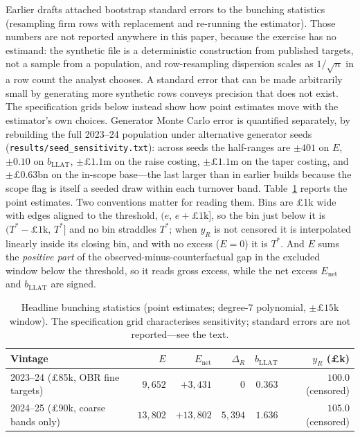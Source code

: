 Earlier drafts attached bootstrap standard errors to the bunching statistics
(resampling firm rows with replacement and re-running the estimator). Those
numbers are not reported anywhere in this paper, because the exercise has no
estimand: the synthetic file is a deterministic construction from published
targets, not a sample from a population, and row-resampling dispersion scales
as $1/\sqrt{n}$ in a row count the analyst chooses. A standard error that can
be made arbitrarily small by generating more synthetic rows conveys precision
that does not exist. The specification grids below instead show how point
estimates move with the estimator's own choices. Generator Monte Carlo error is
quantified separately, by rebuilding the full 2023--24 population under
alternative generator seeds (\texttt{results/seed\_sensitivity.txt}): across
seeds the half-ranges are $\pm401$ on $E$, $\pm0.10$ on
$b_{\mathrm{LLAT}}$, $\pm\pounds1.1$m on the raise costing,
$\pm\pounds1.1$m on the taper costing, and $\pm\pounds0.63$bn
on the in-scope base---the last larger than in earlier builds because the
scope flag is itself a seeded draw within each turnover band. Table~\ref{tab:boot}
reports the point estimates. Two conventions matter for
reading them. Bins are \pounds1k wide with edges aligned to the threshold,
$(e,\,e+\pounds1\text{k}]$, so the bin just below it is
$(T^{*}-\pounds1\text{k},\,T^{*}]$ and no bin straddles $T^{*}$; when $y_R$
is not censored it is interpolated linearly inside its closing bin, and with
no excess ($E=0$) it is $T^{*}$. And $E$ sums the \emph{positive part} of the
observed-minus-counterfactual gap in the excluded window below the threshold,
so it reads gross excess, while the net excess $E_{\mathrm{net}}$ and
$b_{\mathrm{LLAT}}$ are signed.

\begin{table}[t]
\centering
\caption{Headline bunching statistics (point estimates; degree-7 polynomial,
$\pm\pounds15$k window). The specification grid characterises sensitivity;
standard errors are not reported---see the text.}
\label{tab:boot}
\begin{tabular}{lrrrrr}
\toprule
Vintage & $E$ & $E_{\mathrm{net}}$ & $\Delta_R$ & $b_{\mathrm{LLAT}}$ & $y_R$ (\pounds k) \\
\midrule
2023--24 (\pounds85k, OBR fine targets) & $9{,}652$ & $+3{,}431$ & $0$ & $0.363$ & $100.0$ (censored) \\
2024--25 (\pounds90k, coarse bands only) & $13{,}802$ & $+13{,}802$ & $5{,}394$ & $1.636$ & $105.0$ (censored) \\
\bottomrule
\end{tabular}
\end{table}

